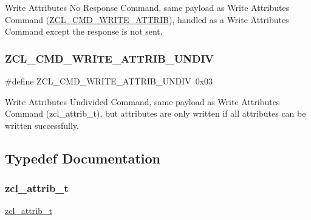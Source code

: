 Write Attributes No Response Command, same payload as Write Attributes Command (\hyperlink{group__zcl_ga8843c2bcb861c091ae6f9a4e36f7e4d8}{Z\+C\+L\+\_\+\+C\+M\+D\+\_\+\+W\+R\+I\+T\+E\+\_\+\+A\+T\+T\+R\+IB}), handled as a Write Attributes Command except the response is not sent. 

\mbox{\label{group__zcl_ga9d67bef86e1ec74d60c06e1a09cfb86a}} 
\subsubsection{\texorpdfstring{Z\+C\+L\+\_\+\+C\+M\+D\+\_\+\+W\+R\+I\+T\+E\+\_\+\+A\+T\+T\+R\+I\+B\+\_\+\+U\+N\+D\+IV}{ZCL\_CMD\_WRITE\_ATTRIB\_UNDIV}}
{\footnotesize\ttfamily \#define Z\+C\+L\+\_\+\+C\+M\+D\+\_\+\+W\+R\+I\+T\+E\+\_\+\+A\+T\+T\+R\+I\+B\+\_\+\+U\+N\+D\+IV~0x03}



Write Attributes Undivided Command, same payload as Write Attributes Command (zcl\+\_\+attrib\+\_\+t), but attributes are only written if all attributes can be written successfully. 



\subsection{Typedef Documentation}
\mbox{\label{group__zcl_ga2373217b6694c1cb1a99113c24519a73}} 
\subsubsection{\texorpdfstring{zcl\+\_\+attrib\+\_\+t}{zcl\_attrib\_t}}
{\footnotesize\ttfamily \hyperlink{group__zcl_ga2373217b6694c1cb1a99113c24519a73}{zcl\+\_\+attrib\+\_\+t}}


